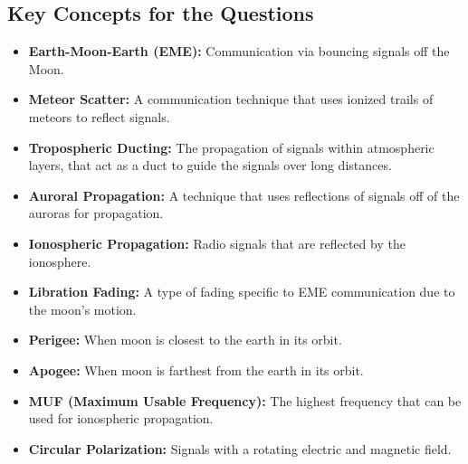 \subsection*{Key Concepts for the Questions}
\begin{itemize}
    \item \textbf{Earth-Moon-Earth (EME):} Communication via bouncing signals off the Moon.
    \item \textbf{Meteor Scatter:} A communication technique that uses ionized trails of meteors to reflect signals.
    \item \textbf{Tropospheric Ducting:} The propagation of signals within atmospheric layers, that act as a duct to guide the signals over long distances.
        \item \textbf{Auroral Propagation:} A technique that uses reflections of signals off of the auroras for propagation.
        \item \textbf{Ionospheric Propagation:} Radio signals that are reflected by the ionosphere.
    \item \textbf{Libration Fading:} A type of fading specific to EME communication due to the moon's motion.
     \item \textbf{Perigee:} When moon is closest to the earth in its orbit.
         \item \textbf{Apogee:} When moon is farthest from the earth in its orbit.
        \item \textbf{MUF (Maximum Usable Frequency):} The highest frequency that can be used for ionospheric propagation.
        \item \textbf{Circular Polarization:} Signals with a rotating electric and magnetic field.

\end{itemize}

